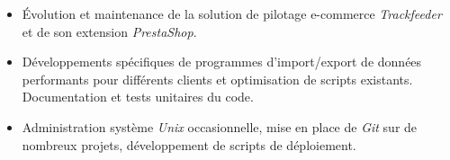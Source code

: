 \documentclass[a4paper]{article}
\begin{document}
\begin{itemize}
  \item Évolution et maintenance de la solution de pilotage e-commerce
  \textit{Trackfeeder} et de son extension \textit{PrestaShop}.
  \item Développements spécifiques de programmes d'import/export de
  données performants pour différents clients et optimisation de scripts
  existants. Documentation et tests unitaires du code.
  \item Administration système \textit{Unix} occasionnelle, mise en
  place de \textit{Git} sur de nombreux projets, développement de
  scripts de déploiement.

\end{itemize}


\end{document}
